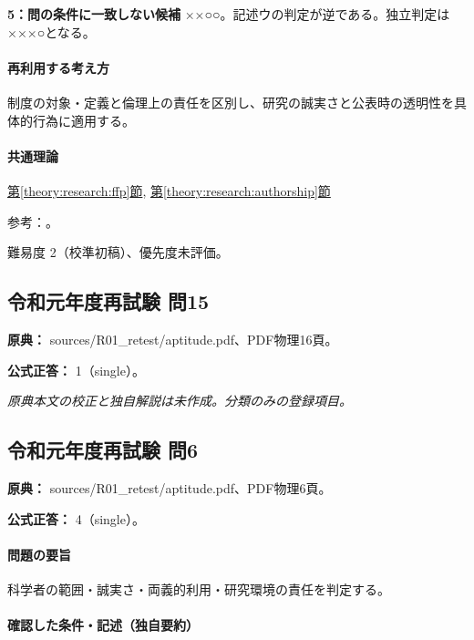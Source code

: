 \noindent\textbf{5：問の条件に一致しない候補} ××○○。記述ウの判定が逆である。独立判定は×××○となる。\par

\paragraph{再利用する考え方} 制度の対象・定義と倫理上の責任を区別し、研究の誠実さと公表時の透明性を具体的行為に適用する。

\paragraph{共通理論} \hyperref[theory:research:ffp]{第\ref*{theory:research:ffp}節}, \hyperref[theory:research:authorship]{第\ref*{theory:research:authorship}節}

\par 参考：\cite{mext_misconduct2014,jsps_integrity2025}。

\par 難易度 2（校準初稿）、優先度未評価。

\subsection{令和元年度再試験 問15}
\label{q:r01-ret-apt-15}

\noindent\textbf{原典：} sources/R01\_retest/aptitude.pdf、PDF物理16頁。

\textbf{公式正答：} 1（single）。

\par\textit{原典本文の校正と独自解説は未作成。分類のみの登録項目。}

\subsection{令和元年度再試験 問6}
\label{q:r01-ret-apt-06}

\noindent\textbf{原典：} sources/R01\_retest/aptitude.pdf、PDF物理6頁。

\textbf{公式正答：} 4（single）。

\paragraph{問題の要旨} 科学者の範囲・誠実さ・両義的利用・研究環境の責任を判定する。

\paragraph{確認した条件・記述（独自要約）}\mbox{}\par

